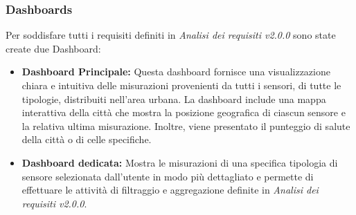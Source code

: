 \subsubsection{Dashboards}
Per soddisfare tutti i requisiti definiti in \textit{Analisi dei requisiti v2.0.0} sono state create due Dashboard:
\begin{itemize}
    \item \textbf{Dashboard Principale:} Questa dashboard fornisce una visualizzazione chiara e intuitiva delle misurazioni provenienti da tutti i sensori, di tutte le tipologie, distribuiti nell'area urbana. La dashboard include una mappa interattiva della città che mostra la posizione geografica di ciascun sensore e la relativa ultima misurazione. Inoltre, viene presentato il punteggio di salute della città o di celle specifiche.
    \item \textbf{Dashboard dedicata:} Mostra le misurazioni di una specifica tipologia di sensore selezionata dall'utente in modo più dettagliato e permette di effettuare le attività di filtraggio e aggregazione definite in \textit{Analisi dei requisiti v2.0.0}.
\end{itemize}



